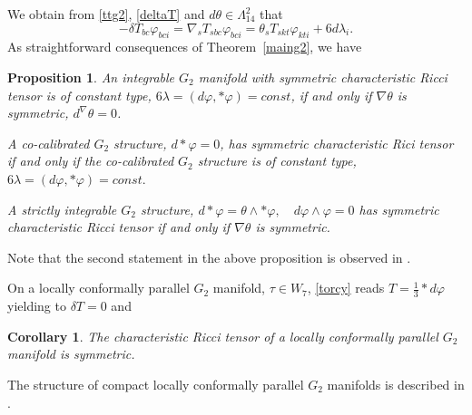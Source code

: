\documentclass[10pt,british]{article}
\newtheorem{prop}[thrm]{Proposition}
\newtheorem{cor}[thrm]{Corollary}
\def\sb {{\nabla}}
\def\p{{\varphi}}
\begin{document}
We  obtain from \eqref{ttg2}, \eqref{deltaT} and $d\theta\in\Lambda^2_{14}$ that
\begin{equation}\label{nnew1}
 -\delta T_{bc}\p_{bci}=\sb_sT_{sbc}\p_{bci}=\theta_sT_{skt}\p_{kti}+6d\lambda_i.
\end{equation}
As straightforward consequences of Theorem~\ref{maing2}, we have
\begin{prop}\label{symsonst}
An integrable $G_2$ manifold with symmetric characteristic Ricci tensor   is of constant type, $6\lambda=(d\p,*\p)=const$, if and only if $\sb\theta$ is symmetric, $d^{\sb}\theta=0$.

A co-calibrated  $G_2$ structure, $d*\p=0$, has symmetric characteristic Rici tensor  if and only if the co-calibrated $G_2$ structure is of constant type, $6\lambda=(d\p,*\p)=const.$

A strictly integrable $G_2$ structure, $d*\p=\theta\wedge*\p, \quad d\p\wedge\p=0$ has symmetric characteristic Ricci tensor if and only if $\sb\theta$ is symmetric.
\end{prop}
Note that the second statement in the above proposition is observed   in \cite{FMR}.

\noindent On a locally conformally parallel $G_2$ manifold, $\tau \in W_7$,  \eqref{torcy} reads $T=\frac13*d\p$ yielding to $\delta T=0$ and
\begin{cor}
The characteristic Ricci tensor of a locally conformally parallel $G_2$ manifold is symmetric.
\end{cor}
The structure of compact locally conformally parallel $G_2$ manifolds is described in \cite{IPP}.
\end{document}
